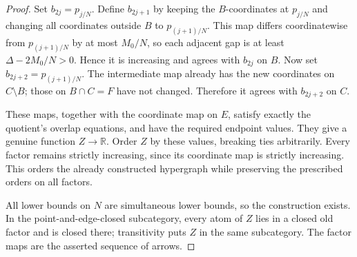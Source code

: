 \begin{proof}
Set $b_{2j}=p_{j/N}$. Define $b_{2j+1}$ by keeping the
$B$-coordinates at $p_{j/N}$ and changing all coordinates outside
$B$ to $p_{(j+1)/N}$. This map differs coordinatewise from
$p_{(j+1)/N}$ by at most $M_0/N$, so each adjacent gap is at least
$\Delta-2M_0/N>0$. Hence it is increasing and agrees with
$b_{2j}$ on $B$. Now set $b_{2j+2}=p_{(j+1)/N}$. The intermediate
map already has the new coordinates on $C\setminus B$; those
on $B\cap C=F$ have not changed. Therefore it agrees with
$b_{2j+2}$ on $C$.

These maps, together with the coordinate map on $E$, satisfy
exactly the quotient's overlap equations, and have the required
endpoint values. They give a genuine function $Z\to\mathbb R$.
Order $Z$ by these values, breaking ties arbitrarily. Every factor
remains strictly increasing, since its coordinate map is strictly
increasing. This orders the already constructed hypergraph while
preserving the prescribed orders on all factors.

All lower bounds on $N$ are simultaneous lower bounds, so the
construction exists. In the point-and-edge-closed subcategory,
every atom of $Z$ lies in a closed old factor and is closed there;
transitivity puts $Z$ in the same subcategory. The factor maps are
the asserted sequence of arrows.
\end{proof}

